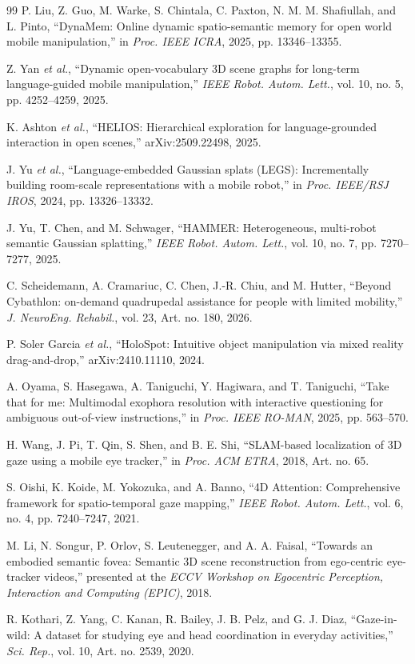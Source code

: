 \documentclass[letterpaper, 10 pt, conference]{ieeeconf}  %
\begin{document}
\begin{thebibliography}{99}
 P. Liu, Z. Guo, M. Warke, S. Chintala,
C. Paxton, N. M. M. Shafiullah, and L. Pinto, ``DynaMem: Online
dynamic spatio-semantic memory for open world mobile manipulation,''
in \emph{Proc. IEEE ICRA}, 2025, pp. 13346--13355.

 Z. Yan \emph{et al.}, ``Dynamic open-vocabulary 3D
scene graphs for long-term language-guided mobile manipulation,''
\emph{IEEE Robot. Autom. Lett.}, vol. 10, no. 5, pp. 4252--4259,
2025.

 K. Ashton \emph{et al.}, ``HELIOS: Hierarchical
exploration for language-grounded interaction in open scenes,''
arXiv:2509.22498, 2025.

 J. Yu \emph{et al.}, ``Language-embedded Gaussian
splats (LEGS): Incrementally building room-scale representations with
a mobile robot,'' in \emph{Proc. IEEE/RSJ IROS}, 2024,
pp. 13326--13332.

 J. Yu, T. Chen, and M. Schwager, ``HAMMER:
Heterogeneous, multi-robot semantic Gaussian splatting,'' \emph{IEEE
Robot. Autom. Lett.}, vol. 10, no. 7, pp. 7270--7277, 2025.

 C. Scheidemann, A. Cramariuc, C. Chen,
J.-R. Chiu, and M. Hutter, ``Beyond Cybathlon: on-demand quadrupedal
assistance for people with limited mobility,'' \emph{J. NeuroEng.
Rehabil.}, vol. 23, Art. no. 180, 2026.

 P. Soler Garcia \emph{et al.}, ``HoloSpot:
Intuitive object manipulation via mixed reality drag-and-drop,''
arXiv:2410.11110, 2024.

 A. Oyama, S. Hasegawa, A. Taniguchi, Y. Hagiwara, and
T. Taniguchi, ``Take that for me: Multimodal exophora resolution with
interactive questioning for ambiguous out-of-view instructions,'' in
\emph{Proc. IEEE RO-MAN}, 2025, pp. 563--570.

 H. Wang, J. Pi, T. Qin, S. Shen, and B. E. Shi,
``SLAM-based localization of 3D gaze using a mobile eye tracker,'' in
\emph{Proc. ACM ETRA}, 2018, Art. no. 65.

 S. Oishi, K. Koide, M. Yokozuka, and A. Banno,
``4D Attention: Comprehensive framework for spatio-temporal gaze
mapping,'' \emph{IEEE Robot. Autom. Lett.}, vol. 6, no. 4,
pp. 7240--7247, 2021.

 M. Li, N. Songur, P. Orlov, S. Leutenegger,
and A. A. Faisal, ``Towards an embodied semantic fovea: Semantic 3D
scene reconstruction from ego-centric eye-tracker videos,'' presented
at the \emph{ECCV Workshop on Egocentric Perception, Interaction and
Computing (EPIC)}, 2018.

 R. Kothari, Z. Yang, C. Kanan, R. Bailey,
J. B. Pelz, and G. J. Diaz, ``Gaze-in-wild: A dataset for studying
eye and head coordination in everyday activities,'' \emph{Sci. Rep.},
vol. 10, Art. no. 2539, 2020.

\end{thebibliography}
\end{document}
